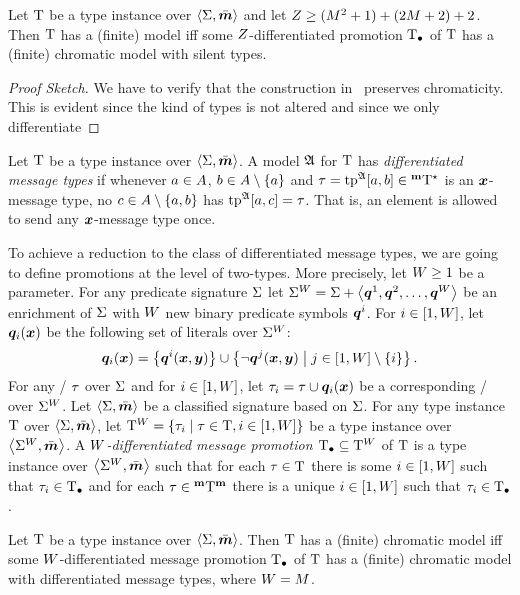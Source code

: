 \begin{remark}\label{rem:step-silent}
Let $\mathrm{T}$ be a type instance over $\left\langle \mathrm{\Sigma},\bar{\bm{m}} \right\rangle$ and let
$Z\geq(M^2+1)+(2M+2)+2$.
Then $\mathrm{T}$ has a (finite) model iff some $Z$-differentiated promotion $\mathrm{T}_{\bullet}$
of $\mathrm{T}$ has a (finite) chromatic model with silent types.
\end{remark}
\begin{proof}[Proof Sketch]
We have to verify that the construction in~ preserves
chromaticity.
This is evident since the kind of types is not altered and since we only
differentiate 
\end{proof}

\begin{definition}
Let $\mathrm{T}$ be a type instance over $\left\langle \mathrm{\Sigma},\bar{\bm{m}} \right\rangle$.
A model $\mathfrak{A}$ for $\mathrm{T}$ has \emph{differentiated message types}
if whenever $a\in A$, $b\in A\setminus\left\{a\right\}$
and $\tau = \operatorname{tp}^{\mathfrak{A}}[a,b]\in{{}^{\bm{\mathrm{m}}}{\mathrm{T}}^{\star}}$ is an $\bm{x}$-message type,
no $c\in A\setminus\left\{a,b\right\}$ has $\operatorname{tp}^{\mathfrak{A}}[a,c] = \tau$.
That is, an element is allowed to send any $\bm{x}$-message type once.
\end{definition}
To achieve a reduction to the class of differentiated message types, we are
going to define promotions at the level of two-types.
More precisely, let $W\geq1$ be a parameter.
For any predicate signature $\mathrm{\Sigma}$ let ${\mathrm{\Sigma}}^{W} = \mathrm{\Sigma} +
\left\langle \bm{q}^{1},\bm{q}^{2},\dots,\bm{q}^{W} \right\rangle$ be an enrichment of $\mathrm{\Sigma}$ with $W$ new binary
predicate symbols $\bm{q}^{i}$.
For $i\in[1,W]$, let $\bm{q}_{i}(\bm{x})$ be the following set of literals over
${\mathrm{\Sigma}}^{W}$:
\[
\bm{q}_{i}(\bm{x}) =
\left\{\bm{q}^{i}(\bm{x},\bm{y})\right\}\cup\left\{\lnot\bm{q}^{j}(\bm{x},\bm{y})\mathrel{}\middle|\mathrel{}j\in[1,W]\setminus\left\{i\right\}\right\}.
\]
For any \twotype/ $\tau$ over $\mathrm{\Sigma}$ and for $i\in[1,W]$, let ${\tau}_{i}
= \tau\cup\bm{q}_{i}(\bm{x})$ be a corresponding \twotype/ over ${\mathrm{\Sigma}}^{W}$.
Let $\left\langle \mathrm{\Sigma},\bar{\bm{m}} \right\rangle$ be a classified signature based on $\mathrm{\Sigma}$.
For any type instance $\mathrm{T}$ over $\left\langle \mathrm{\Sigma},\bar{\bm{m}} \right\rangle$, let
${\mathrm{T}}^{W} = \left\{{\tau}_{i}\mathrel{}\middle|\mathrel{}\tau\in\mathrm{T},i\in[1,W]\right\}$ be a type instance
over $\left\langle {\mathrm{\Sigma}}^{W},\bar{\bm{m}} \right\rangle$.
A \emph{$W$-differentiated message promotion $\mathrm{T}_{\bullet}\subseteq{\mathrm{T}}^{W}$} of
$\mathrm{T}$ is a type instance over $\left\langle {\mathrm{\Sigma}}^{W},\bar{\bm{m}} \right\rangle$ such that for each
$\tau\in\mathrm{T}$ there is some $i\in[1,W]$ such that ${\tau}_{i}\in\mathrm{T}_{\bullet}$ and for
each $\tau\in{{}^{\bm{\mathrm{m}}}{\mathrm{T}}^{\bm{\mathrm{m}}}}$ there is a unique $i\in[1,W]$ such that
${\tau}_{i}\in\mathrm{T}_{\bullet}$.
\begin{remark}
Let $\mathrm{T}$ be a type instance over $\left\langle \mathrm{\Sigma},\bar{\bm{m}} \right\rangle$.
Then $\mathrm{T}$ has a (finite) chromatic model iff some $W$-differentiated message
promotion $\mathrm{T}_{\bullet}$ of $\mathrm{T}$ has a (finite) chromatic model with differentiated
message types, where $W = M$.
\end{remark}

